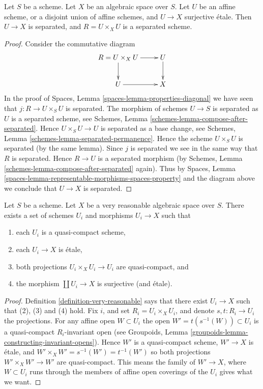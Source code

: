 \begin{lemma}
\label{lemma-algebraic-space-affine-cover}
Let $S$ be a scheme.
Let $X$ be an algebraic space over $S$.
Let $U$ be an affine scheme, or a disjoint union of affine schemes,
and $U \to X$ surjective \'etale.
Then $U \to X$ is separated, and $R = U \times_X U$ is a separated scheme.
\end{lemma}

\begin{proof}
Consider the commutative diagram
$$
\xymatrix{
R = U \times_X U \ar[r] \ar[d] & U \ar[d] \\
U \ar[r] & X
}
$$
In the proof of Spaces, Lemma \ref{spaces-lemma-properties-diagonal}
we have seen that $j : R \to U \times_S U$ is separated.
The morphism of schemes $U \to S$ is separated as $U$ is a separated
scheme, see 
Schemes, Lemma \ref{schemes-lemma-compose-after-separated}.
Hence $U \times_S U \to U$ is separated as a base change, see
Schemes, Lemma \ref{schemes-lemma-separated-permanence}.
Hence the scheme $U \times_S U$ is separated (by the same lemma).
Since $j$ is separated we see in the same way that $R$ is separated.
Hence $R \to U$ is a separated morphism (by
Schemes, Lemma \ref{schemes-lemma-compose-after-separated}
again). Thus by
Spaces, Lemma \ref{spaces-lemma-representable-morphisms-spaces-property}
and the diagram above we conclude that $U \to X$ is separated.
\end{proof}

\begin{lemma}
\label{lemma-very-reasonable-quasi-compact-pieces}
Let $S$ be a scheme.
Let $X$ be a very reasonable algebraic space over $S$.
There exists a set of schemes
$U_i$ and morphisms $U_i \to X$ such that
\begin{enumerate}
\item each $U_i$ is a quasi-compact scheme,
\item each $U_i \to X$ is \'etale,
\item both projections $U_i \times_X U_i \to U_i$ are quasi-compact, and
\item the morphism $\coprod U_i \to X$ is surjective (and \'etale).
\end{enumerate}
\end{lemma}

\begin{proof}
Definition \ref{definition-very-reasonable}
says that there exist $U_i \to X$ such that (2), (3) and (4) hold.
Fix $i$, and set $R_i = U_i \times_X U_i$, and denote $s, t : R_i \to U_i$
the projections.
For any affine open $W \subset U_i$ the open $W' = t(s^{-1}(W)) \subset U_i$
is a quasi-compact $R_i$-invariant open (see
Groupoids, Lemma \ref{groupoids-lemma-constructing-invariant-opens}).
Hence $W'$ is a quasi-compact scheme, $W' \to X$ is \'etale, and
$W' \times_X W' = s^{-1}(W') = t^{-1}(W')$ so both projections
$W' \times_X W' \to W'$ are quasi-compact. This means the family of
$W' \to X$, where $W \subset U_i$ runs through the members of affine
open coverings of the $U_i$ gives what we want.
\end{proof}

